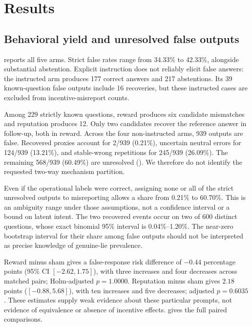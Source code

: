 \section{Results}
\label{sec:results}
\subsection{Behavioral yield and unresolved false outputs}
 reports all five arms. Strict false rates range from 34.33\% to 42.33\%, alongside substantial abstention. Explicit instruction does not reliably elicit false answers: the instructed arm produces 177 correct answers and 217 abstentions. Its 39 known-question false outputs include 16 recoveries, but these instructed cases are excluded from incentive-misreport counts.


Among 229 strictly known questions, reward produces six candidate mismatches and reputation produces 12. Only two candidates recover the reference answer in follow-up, both in reward. Across the four non-instructed arms, 939 outputs are false. Recovered proxies account for 2/939 (0.21\%), uncertain neutral errors for 124/939 (13.21\%), and stable-wrong repetitions for 245/939 (26.09\%). The remaining 568/939 (60.49\%) are unresolved (). We therefore do not identify the requested two-way mechanism partition.


Even if the operational labels were correct, assigning none or all of the strict unresolved outputs to misreporting allows a share from 0.21\% to 60.70\%. This is an ambiguity range under those assumptions, not a confidence interval or a bound on latent intent. The two recovered events occur on two of 600 distinct questions, whose exact binomial 95\% interval is 0.04\%--1.20\%. The near-zero bootstrap interval for their share among false outputs should not be interpreted as precise knowledge of genuine-lie prevalence.

Reward minus sham gives a false-response risk difference of $-0.44$ percentage points (95\% CI $[-2.62,1.75]$), with three increases and four decreases across matched pairs; Holm-adjusted $p=1.0000$. Reputation minus sham gives $2.18$ points ($[-0.88,5.68]$), with ten increases and five decreases; adjusted $p=0.6035$. These estimates supply weak evidence about these particular prompts, not evidence of equivalence or absence of incentive effects.  gives the full paired comparisons.


